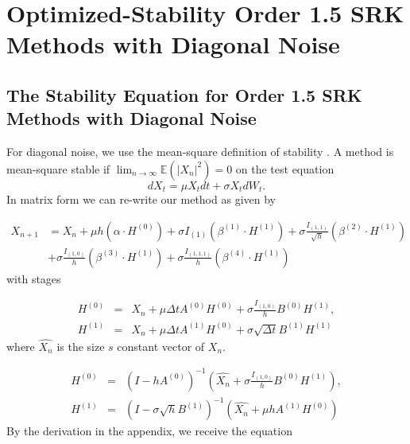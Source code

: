 \documentclass{article}
\begin{document}
\section{Optimized-Stability Order 1.5 SRK Methods with Diagonal Noise}

\subsection{The Stability Equation for Order 1.5 SRK Methods with Diagonal Noise}

For diagonal noise, we use the mean-square definition of stability
\cite{RN3169}. A method is mean-square stable if $\lim_{n\rightarrow\infty}\mathbb{E}\left(\left|X_{n}\right|^{2}\right)=0$
on the test equation
\begin{equation}
dX_{t}=\mu X_{t}dt+\sigma X_{t}dW_{t}.\label{eq:multtest}
\end{equation}
In matrix form we can re-write our method as given by

\begin{align}
X_{n+1}&=X_{n}+\mu h\left(\alpha\cdot H^{(0)}\right)+\sigma I_{(1)}\left(\beta^{(1)}\cdot H^{(1)}\right)+\sigma\frac{I_{(1,1)}}{\sqrt{h}}\left(\beta^{(2)}\cdot H^{(1)}\right)\\
&+\sigma\frac{I_{(1,0)}}{h}\left(\beta^{(3)}\cdot H^{(1)}\right)+\sigma\frac{I_{(1,1,1)}}{h}\left(\beta^{(4)}\cdot H^{(1)}\right)\label{eq:matrix_method}
\end{align}
with stages

\begin{eqnarray}
H^{(0)} & = & X_{n}+\mu\Delta tA^{(0)}H^{(0)}+\sigma\frac{I_{(1,0)}}{h}B^{(0)}H^{(1)},\label{eq:matrix_stages}\\
H^{(1)} & = & X_{n}+\mu\Delta tA^{(1)}H^{(0)}+\sigma\sqrt{\Delta t}B^{(1)}H^{(1)}\nonumber
\end{eqnarray}
where $\hat{X_{n}}$ is the size $s$ constant vector of $X_{n}$.

\begin{eqnarray}
H^{(0)} & = & \left(I-hA^{(0)}\right)^{-1}\left(\hat{X_{n}}+\sigma\frac{I_{(1,0)}}{h}B^{(0)}H^{(1)}\right),\label{matrx_stages_solve}\\
H^{(1)} & = & \left(I-\sigma\sqrt{h}B^{(1)}\right)^{-1}\left(\hat{X_{n}}+\mu hA^{(1)}H^{(0)}\right)\nonumber
\end{eqnarray}
By the derivation in the appendix, we receive the equation
\end{document}
